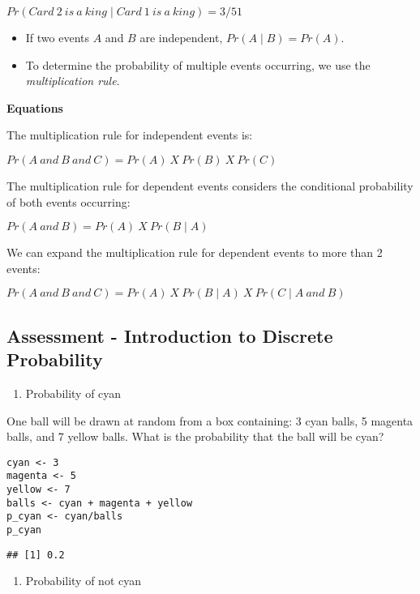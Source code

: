 \documentclass[
]{article}
\providecommand{\tightlist}{%
  \setlength{\itemsep}{0pt}\setlength{\parskip}{0pt}}
\begin{document}
\(Pr(Card\:2\:is\:a\:king \mid Card\:1\:is\:a\:king) = 3/51\)

\begin{itemize}
\tightlist
\item
  If two events \(A\) and \(B\) are independent,
  \(Pr(A \mid B) = Pr(A)\).
\item
  To determine the probability of multiple events occurring, we use the
  \emph{multiplication rule}.
\end{itemize}

\textbf{Equations}

The multiplication rule for independent events is:

\(Pr(A\:and\:B\:and\:C) = Pr(A)\:X\:Pr(B)\:X\:Pr(C)\)

The multiplication rule for dependent events considers the conditional
probability of both events occurring:

\(Pr(A\:and\:B) = Pr(A)\:X\:Pr(B \mid A)\)

We can expand the multiplication rule for dependent events to more than
2 events:

\(Pr(A\:and\:B\:and\:C) = Pr(A)\:X\:Pr(B \mid A)\:X\:Pr(C \mid A\:and\:B)\)

\hypertarget{assessment---introduction-to-discrete-probability}{%
\subsection{Assessment - Introduction to Discrete
Probability}\label{assessment---introduction-to-discrete-probability}}

\begin{enumerate}
\def\labelenumi{\arabic{enumi}.}
\tightlist
\item
  Probability of cyan
\end{enumerate}

One ball will be drawn at random from a box containing: 3 cyan balls, 5
magenta balls, and 7 yellow balls. What is the probability that the ball
will be cyan?

\begin{verbatim}
cyan <- 3
magenta <- 5
yellow <- 7
balls <- cyan + magenta + yellow
p_cyan <- cyan/balls
p_cyan
\end{verbatim}

\begin{verbatim}
## [1] 0.2
\end{verbatim}

\begin{enumerate}
\def\labelenumi{\arabic{enumi}.}
\setcounter{enumi}{1}
\tightlist
\item
  Probability of not cyan
\end{enumerate}
\end{document}
